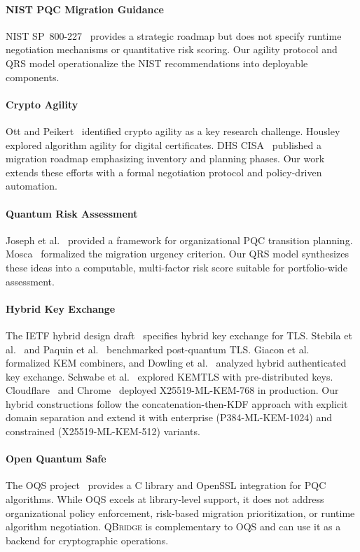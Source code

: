 \documentclass[conference,10pt]{IEEEtran}
\newcommand{\system}{\textsc{QBridge}}
\begin{document}
\paragraph{NIST PQC Migration Guidance}
NIST SP~800-227~\cite{nist-sp800-227} provides a strategic roadmap but
does not specify runtime negotiation mechanisms or quantitative risk
scoring. Our agility protocol and QRS model operationalize the NIST
recommendations into deployable components.

\paragraph{Crypto Agility}
Ott and Peikert~\cite{ott2019} identified crypto agility as a key
research challenge. Housley~\cite{housley2024} explored algorithm agility
for digital certificates. DHS CISA~\cite{dhs-pqc-roadmap} published a
migration roadmap emphasizing inventory and planning phases. Our work
extends these efforts with a formal negotiation protocol and
policy-driven automation.

\paragraph{Quantum Risk Assessment}
Joseph et al.~\cite{joseph2022} provided a framework for organizational
PQC transition planning. Mosca~\cite{mosca2018} formalized the migration
urgency criterion. Our QRS model synthesizes these ideas into a
computable, multi-factor risk score suitable for portfolio-wide
assessment.

\paragraph{Hybrid Key Exchange}
The IETF hybrid design draft~\cite{draft-hybrid-design} specifies
hybrid key exchange for TLS. Stebila et al.~\cite{bos2018} and
Paquin et al.~\cite{paquin2020} benchmarked post-quantum TLS.
Giacon et al.~\cite{giacon2018} formalized KEM combiners, and
Dowling et al.~\cite{dowling2020} analyzed hybrid authenticated key
exchange. Schwabe et al.~\cite{schwabe2024} explored KEMTLS with
pre-distributed keys. Cloudflare~\cite{cloudflare-pq} and
Chrome~\cite{chrome-pq} deployed X25519-ML-KEM-768 in production.
Our hybrid constructions follow the concatenation-then-KDF approach
with explicit domain separation and extend it with enterprise
(P384-ML-KEM-1024) and constrained (X25519-ML-KEM-512) variants.

\paragraph{Open Quantum Safe}
The OQS project~\cite{paquin2020} provides a C library and OpenSSL
integration for PQC algorithms. While OQS excels at library-level
support, it does not address organizational policy enforcement,
risk-based migration prioritization, or runtime algorithm negotiation.
\system{} is complementary to OQS and can use it as a backend for
cryptographic operations.
\end{document}
